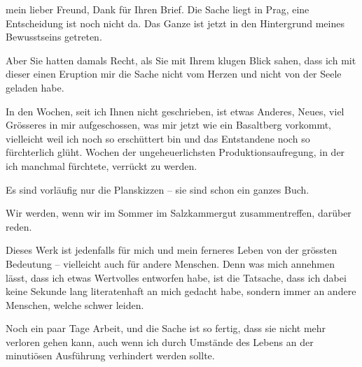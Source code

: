 \pstart{}mein lieber Freund,\pend\vspace{0.5em}
\pstart
           Dank für Ihren Brief. Die Sache liegt in Prag,
               eine Entscheidung ist noch nicht da. Das Ganze ist jetzt in den Hintergrund meines
               Bewusstseins getreten.\pend
           
\pstart
           Aber Sie hatten damals Recht, als Sie mit Ihrem klugen Blick sahen, dass ich mit
               dieser einen Eruption mir die Sache nicht vom Herzen und nicht von der Seele geladen
               habe.\pend
           
\pstart
           In den Wochen, seit ich Ihnen nicht geschrieben, ist etwas Anderes, Neues, viel
               Grösseres in mir aufgeschossen, was mir jetzt wie ein Basaltberg vorkommt, vielleicht
               weil ich noch so erschüttert bin und das Entstandene noch so fürchterlich glüht. {\pb}Wochen der ungeheuerlichsten Produktionsaufregung, in der ich manchmal fürchtete,
               verrückt zu werden.\pend
           
\pstart
           Es sind vorläufig nur die Planskizzen – sie sind schon ein ganzes Buch.\pend
           
\pstart
           Wir werden, wenn wir im Sommer im Salzkammergut
               zusammentreffen, darüber reden.\pend
           
\pstart
           Dieses Werk ist jedenfalls für
               mich und mein ferneres Leben von der grössten Bedeutung – vielleicht auch für andere
               Menschen. Denn was mich annehmen lässt, dass ich etwas Wertvolles entworfen habe, ist
               die Tatsache, dass ich dabei keine Sekunde lang literatenhaft an mich gedacht habe,
               sondern immer an andere Menschen, welche schwer leiden.\pend
           
\pstart
           Noch ein paar Tage Arbeit, und die Sache ist so fertig, dass sie nicht mehr verloren
               gehen kann, auch wenn ich durch Umstände des Lebens an der minutiösen Ausführung
               verhindert werden sollte.\pend
           
